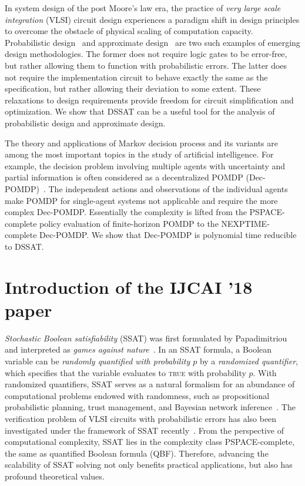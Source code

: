     In system design of the post Moore's law era, the practice of \textit{very large scale integration} (VLSI) circuit design experiences a paradigm shift in design principles to overcome the obstacle of physical scaling of computation capacity.
    Probabilistic design~\cite{Chakrapani2006ProbDesign} and approximate design~\cite{Venkatesan2011ApproxDesign} are two such examples of emerging design methodologies.
    The former does not require logic gates to be error-free, but rather allowing them to function with probabilistic errors.
    The latter does not require the implementation circuit to behave exactly the same as the specification, but rather allowing their deviation to some extent.
    These relaxations to design requirements provide freedom for circuit simplification and optimization.
    We show that DSSAT can be a useful tool for the analysis of probabilistic design and approximate design.

    The theory and applications of Markov decision process and its variants are among the most important topics in the study of artificial intelligence.
    For example, the decision problem involving multiple agents with uncertainty and partial information is often considered as a decentralized POMDP (Dec-POMDP)~\cite{Oliehoek2016}.
    The independent actions and observations of the individual agents make POMDP for single-agent systems not applicable and require the more complex Dec-POMDP.
    Essentially the complexity is lifted from the PSPACE-complete policy evaluation of finite-horizon POMDP to the NEXPTIME-complete Dec-POMDP.
    We show that Dec-POMDP is polynomial time reducible to DSSAT.

    \section{Introduction of the IJCAI '18 paper}
    \textit{Stochastic Boolean satisfiability} (SSAT) was first formulated by Papadimitriou and interpreted as \emph{games against nature}~\cite{Papadimitriou1985}.
    In an SSAT formula, a Boolean variable can be \textit{randomly quantified with probability $p$} by a \textit{randomized quantifier}, which specifies that the variable evaluates to \textsc{true} with probability $p$.
    With randomized quantifiers, SSAT serves as a natural formalism for an abundance of computational problems endowed with randomness, such as propositional probabilistic planning, trust management, and Bayesian network inference~\cite{Littman2001,SATHandbook-SSAT,Hnich2011}.
    The verification problem of VLSI circuits with probabilistic errors has also been investigated under the framework of SSAT recently~\cite{LeeTC18ProbDesign}.
    From the perspective of computational complexity, SSAT lies in the complexity class PSPACE-complete, the same as quantified Boolean formula (QBF).
    Therefore, advancing the scalability of SSAT solving not only benefits practical applications, but also has profound theoretical values.

